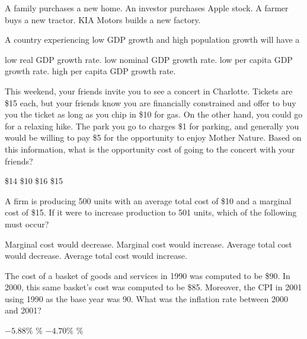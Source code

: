 \documentclass[addpoints,11pt]{exam}
\theoremstyle{definition}
\begin{document}
\begin{questions}
	\begin{choices}
		\choice A family purchases a new home.
		\CorrectChoice An investor purchases Apple stock.
		\choice A farmer buys a new tractor.
		\choice KIA Motors builds a new factory.
	\end{choices}
	
	\question A country experiencing low GDP growth and high population growth will have a
	
	\begin{choices}
		\choice low real GDP growth rate.
		\choice low nominal GDP growth rate.
		\CorrectChoice low per capita GDP growth rate.
		\choice high per capita GDP growth rate.
	\end{choices}
	
	\question This weekend, your friends invite you to see a concert in Charlotte. Tickets are \$15 each, but your friends know you are financially constrained and offer to buy you the ticket as long as you chip in \$10 for gas. On the other hand, you could go for a relaxing hike. The park you go to charges \$1 for parking, and generally you would be willing to pay \$5 for the opportunity to enjoy Mother Nature. Based on this information, what is the opportunity cost of going to the concert with your friends?
	
	\begin{choices}
		\CorrectChoice \$14
		\choice \$10
		\choice \$16
		\choice \$15
	\end{choices}
	
	\question A firm is producing 500 units with an average total cost of \$10 and a marginal cost of \$15. If it were to increase production to 501 units, which of the following must occur?
	
	\begin{choices}
		\choice Marginal cost would decrease.
		\choice Marginal cost would increase.
		\choice Average total cost would decrease.
		\CorrectChoice Average total cost would increase.
	\end{choices}


	\question The cost of a basket of goods and services in 1990 was computed to be \$90. In 2000, this same basket's cost was computed to be \$85. Moreover, the CPI in 2001 using 1990 as the base year was 90. What was the inflation rate between 2000 and 2001?
	
	\begin{choices}
		\choice $-5.88\%$
		\choice 4.70\%
		\CorrectChoice $-4.70\%$ 
		\choice 5.88\%
	\end{choices}
	

\end{questions}
\end{document}
